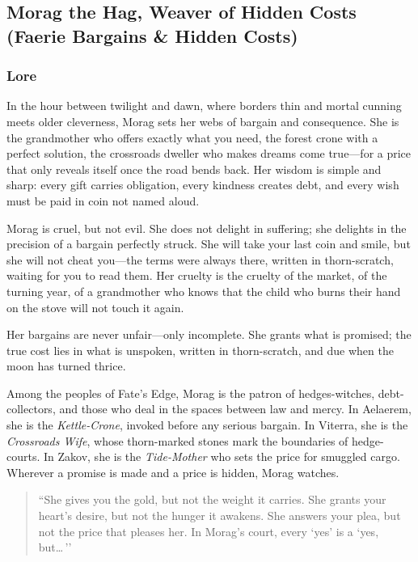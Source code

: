 
\subsection{Morag the Hag, Weaver of Hidden Costs (Faerie Bargains \& Hidden Costs)}

\subsubsection*{Lore}
In the hour between twilight and dawn, where borders thin and mortal cunning meets older cleverness, Morag sets her webs of bargain and consequence. She is the grandmother who offers exactly what you need, the forest crone with a perfect solution, the crossroads dweller who makes dreams come true---for a price that only reveals itself once the road bends back. Her wisdom is simple and sharp: every gift carries obligation, every kindness creates debt, and every wish must be paid in coin not named aloud.

Morag is cruel, but not evil. She does not delight in suffering; she delights in the precision of a bargain perfectly struck. She will take your last coin and smile, but she will not cheat you---the terms were always there, written in thorn-scratch, waiting for you to read them. Her cruelty is the cruelty of the market, of the turning year, of a grandmother who knows that the child who burns their hand on the stove will not touch it again.

Her bargains are never unfair---only incomplete. She grants what is promised; the true cost lies in what is unspoken, written in thorn-scratch, and due when the moon has turned thrice.

Among the peoples of Fate's Edge, Morag is the patron of hedges-witches, debt-collectors, and those who deal in the spaces between law and mercy. In Aelaerem, she is the \textit{Kettle-Crone}, invoked before any serious bargain. In Viterra, she is the \textit{Crossroads Wife}, whose thorn-marked stones mark the boundaries of hedge-courts. In Zakov, she is the \textit{Tide-Mother} who sets the price for smuggled cargo. Wherever a promise is made and a price is hidden, Morag watches.

\begin{quote}
``She gives you the gold, but not the weight it carries. She grants your heart's desire, but not the hunger it awakens. She answers your plea, but not the price that pleases her. In Morag's court, every `yes' is a `yes, but\ldots\,''
\end{quote}


